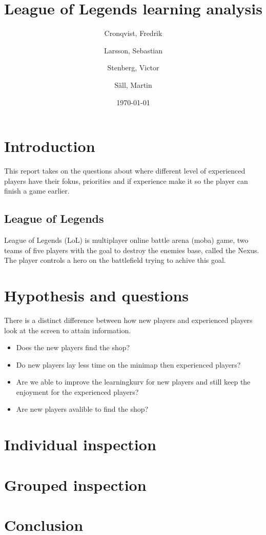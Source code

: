 \documentclass{article}
\author{Cronqvist, Fredrik \and Larsson, Sebastian \and Stenberg, Victor \and S\"{a}ll, Martin}
\date{\today}
\title{League of Legends learning analysis}
\begin{document}
\maketitle

\section{Introduction}
This report takes on the questions about where different level of experienced players have their fokus, priorities and if experience make it so the player can finish a game earlier. 

\subsection{League of Legends}
League of Legends (LoL) is multiplayer online battle arena (moba) game, two teams of five players with the goal to destroy the enemies base, called the Nexus. The player controls a hero on the battlefield trying to achive this goal. 

\section{Hypothesis and questions}
There is a distinct difference between how new players and experienced players look at the screen to attain information.
\begin{itemize}
\item Does the new players find the shop?
\item Do new players lay less time on the minimap then experienced players?
\item Are we able to improve the learningkurv for new players and still keep the enjoyment for the experienced players?
\item Are new players avalible to find the shop? %
\end{itemize}

\section{Individual inspection}

\section{Grouped inspection}

\section{Conclusion}
\end{document}

